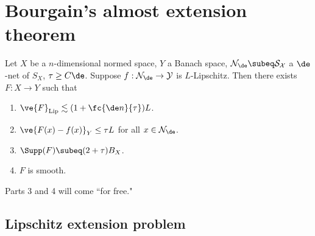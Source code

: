 

\section{Bourgain's almost extension theorem}
%
\begin{thm} 
\label{thm:baet}
Let $X$ be a $n$-dimensional normed space, $Y$ a Banach space, $\cal N_\de\subeq S_X$ a $\de$-net of $S_X$, $\tau\ge C\de$. Suppose $f:\cal N_\de\to Y$ is $L$-Lipschitz. Then there exists $F:X\to Y$ such that 
\begin{enumerate}
\item $\ve{F}_{\text{Lip}} \lesssim (1+\fc{\de n}{\tau}) L$.
\item $\ve{F(x)-f(x)}_Y\le \tau L$ for all $x\in \cal N_\de$. 
\item $\Supp(F) \subeq (2+\tau)B_X$.
\item $F$ is smooth.
\end{enumerate} %
Parts 3 and 4 will come ``for free."
\end{thm}
\subsection{Lipschitz extension problem}

